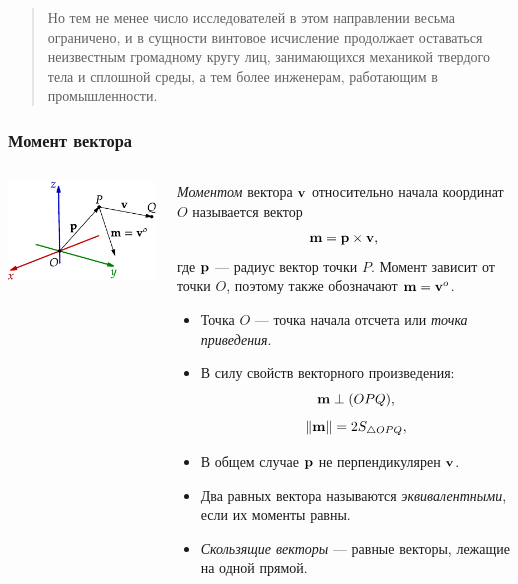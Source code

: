 \begin{frame}
  \frametitle{}
  \begin{quote}
    Но тем не менее число исследователей в этом направлении весьма ограничено, и в сущности винтовое исчисление продолжает оставаться неизвестным громадному кругу лиц, занимающихся механикой твердого тела и сплошной среды, а тем более инженерам, работающим в промышленности.
  \end{quote}
\end{frame}

\begin{frame}
  \frametitle{Момент вектора}
  \begin{columns}
    \begin{column}{0.3\textwidth}
      \begin{center}
        \includegraphics{img/screws/moment01}
      \end{center}
    \end{column}
    \begin{column}{0.7\textwidth}
      \emph{Моментом} вектора $\vb{v}$ относительно начала координат $O$ называется вектор
      \begin{equation*}
        \vb{m} = \vb{p} \times \vb{v},
      \end{equation*}
      где $\vb{p}$ — радиус вектор точки $P$. Момент зависит от точки $O$, поэтому также обозначают $\vb{m} = \vb{v}^{o}$.
      \begin{itemize}
        \item Точка $O$ — точка начала отсчета или \emph{точка приведения}.
        \item В силу свойств векторного произведения:
        \begin{equation*}
          \vb{m} \perp (OPQ),
        \end{equation*}
        \begin{equation*}
          \norm{\vb{m}} = 2S_{\triangle OPQ},
        \end{equation*}
        \item В общем случае $\vb{p}$ не перпендикулярен $\vb{v}$.
        \item Два равных вектора называются \emph{эквивалентными}, если их моменты равны.
        \item \emph{Скользящие векторы} — равные векторы, лежащие на одной прямой.
      \end{itemize}
    \end{column}
  \end{columns}
\end{frame}

